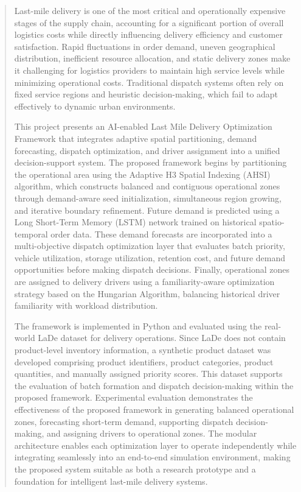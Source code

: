 \documentclass{article}
\begin{document}
\begin{abstract}
Last-mile delivery is one of the most critical and operationally expensive stages of the supply chain, accounting for a significant portion of overall logistics costs while directly influencing delivery efficiency and customer satisfaction. Rapid fluctuations in order demand, uneven geographical distribution, inefficient resource allocation, and static delivery zones make it challenging for logistics providers to maintain high service levels while minimizing operational costs. Traditional dispatch systems often rely on fixed service regions and heuristic decision-making, which fail to adapt effectively to dynamic urban environments.

This project presents an AI-enabled Last Mile Delivery Optimization Framework that integrates adaptive spatial partitioning, demand forecasting, dispatch optimization, and driver assignment into a unified decision-support system. The proposed framework begins by partitioning the operational area using the Adaptive H3 Spatial Indexing (AHSI) algorithm, which constructs balanced and contiguous operational zones through demand-aware seed initialization, simultaneous region growing, and iterative boundary refinement. Future demand is predicted using a Long Short-Term Memory (LSTM) network trained on historical spatio-temporal order data. These demand forecasts are incorporated into a multi-objective dispatch optimization layer that evaluates batch priority, vehicle utilization, storage utilization, retention cost, and future demand opportunities before making dispatch decisions. Finally, operational zones are assigned to delivery drivers using a familiarity-aware optimization strategy based on the Hungarian Algorithm, balancing historical driver familiarity with workload distribution.

The framework is implemented in Python and evaluated using the real-world LaDe dataset for delivery operations. Since LaDe does not contain product-level inventory information, a synthetic product dataset was developed comprising product identifiers, product categories, product quantities, and manually assigned priority scores. This dataset supports the evaluation of batch formation and dispatch decision-making within the proposed framework.
Experimental evaluation demonstrates the effectiveness of the proposed framework in generating balanced operational zones, forecasting short-term demand, supporting dispatch decision-making, and assigning drivers to operational zones. The modular architecture enables each optimization layer to operate independently while integrating seamlessly into an end-to-end simulation environment, making the proposed system suitable as both a research prototype and a foundation for intelligent last-mile delivery systems.

\end{abstract}
\end{document}
